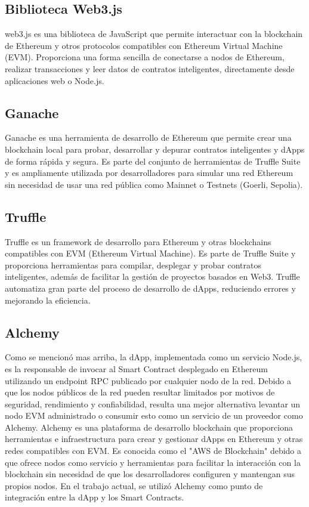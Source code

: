 \subsection{Biblioteca Web3.js}

web3.js \citep{web3} es una biblioteca de JavaScript que permite interactuar con la blockchain de Ethereum y otros protocolos compatibles con Ethereum Virtual Machine (EVM). Proporciona una forma sencilla de conectarse a nodos de Ethereum, realizar transacciones y leer datos de contratos inteligentes, directamente desde aplicaciones web o Node.js.


\subsection{Ganache}

Ganache \cite{ganache_website} es una herramienta de desarrollo de Ethereum que permite crear una blockchain local para probar, desarrollar y depurar contratos inteligentes y dApps de forma rápida y segura. Es parte del conjunto de herramientas de Truffle Suite y es ampliamente utilizada por desarrolladores para simular una red Ethereum sin necesidad de usar una red pública como Mainnet o Testnets (Goerli, Sepolia).


\subsection{Truffle}

Truffle \cite{truffle_website} es un framework de desarrollo para Ethereum y otras blockchains compatibles con EVM (Ethereum Virtual Machine). Es parte de Truffle Suite y proporciona herramientas para compilar, desplegar y probar contratos inteligentes, además de facilitar la gestión de proyectos basados en Web3. Truffle automatiza gran parte del proceso de desarrollo de dApps, reduciendo errores y mejorando la eficiencia.

\subsection{Alchemy}

Como se mencionó mas arriba, la dApp, implementada como un servicio Node.js, es la responsable de invocar al Smart Contract desplegado en Ethereum utilizando un endpoint RPC publicado por cualquier nodo de la red. Debido a que los nodos públicos de la red pueden resultar limitados por motivos de seguridad, rendimiento y confiabilidad, resulta una mejor alternativa levantar un nodo EVM administrado o consumir esto como un servicio de un proveedor como Alchemy. Alchemy \cite{alchemy_website} es una plataforma de desarrollo blockchain que proporciona herramientas e infraestructura para crear y gestionar dApps en Ethereum y otras redes compatibles con EVM. Es conocida como el "AWS de Blockchain" debido a que ofrece nodos como servicio y herramientas para facilitar la interacción con la blockchain sin necesidad de que los desarrolladores configuren y mantengan sus propios nodos. En el trabajo actual, se utilizó Alchemy como punto de integración entre la dApp y los Smart Contracts.

